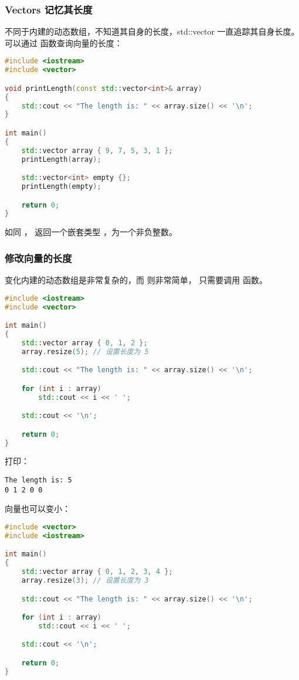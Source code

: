 \documentclass[../../LearnCpp.tex]{subfiles}
\begin{document}
\subsubsection*{Vectors 记忆其长度}

不同于内建的动态数组，不知道其自身的长度，std::vector 一直追踪其自身长度。
可以通过  函数查询向量的长度：

\begin{lstlisting}[language=C++]
#include <iostream>
#include <vector>

void printLength(const std::vector<int>& array)
{
    std::cout << "The length is: " << array.size() << '\n';
}

int main()
{
    std::vector array { 9, 7, 5, 3, 1 };
    printLength(array);

    std::vector<int> empty {};
    printLength(empty);

    return 0;
}
\end{lstlisting}

如同 ， 返回一个嵌套类型 ，为一个非负整数。

\subsubsection*{修改向量的长度}

变化内建的动态数组是非常复杂的，而  则非常简单，
只需要调用  函数。

\begin{lstlisting}[language=C++]
#include <iostream>
#include <vector>

int main()
{
    std::vector array { 0, 1, 2 };
    array.resize(5); // 设置长度为 5

    std::cout << "The length is: " << array.size() << '\n';

    for (int i : array)
        std::cout << i << ' ';

    std::cout << '\n';

    return 0;
}
\end{lstlisting}

打印：

\begin{lstlisting}
The length is: 5
0 1 2 0 0
\end{lstlisting}

向量也可以变小：

\begin{lstlisting}[language=C++]
#include <vector>
#include <iostream>

int main()
{
    std::vector array { 0, 1, 2, 3, 4 };
    array.resize(3); // 设置长度为 3

    std::cout << "The length is: " << array.size() << '\n';

    for (int i : array)
        std::cout << i << ' ';

    std::cout << '\n';

    return 0;
}
\end{lstlisting}
\end{document}

